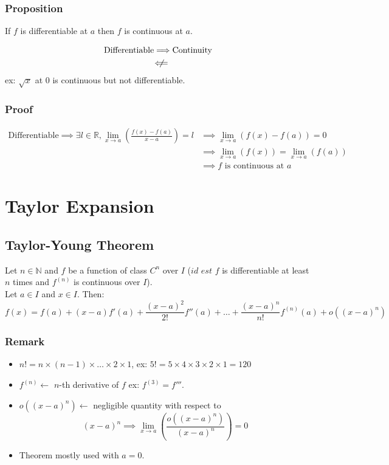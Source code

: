 \documentclass[notitlepage]{math}
\begin{document}
\subsubsection{Proposition}
\begin{minipage}{0.35\linewidth}
    If $f$ is differentiable at $a$ then $f$ is continuous at $a$.
\end{minipage}
\hfill\vline\hfill
\begin{minipage}{0.54\linewidth}
    \begin{align*}
        \text{Differentiable} &\Longrightarrow \text{Continuity}\\
        &\;\not\!\!\!\Longleftarrow  
    \end{align*}
        ex: $\sqrt{x}$ at $0$ is continuous but not differentiable.
\end{minipage}
\subsubsection{Proof}
\begin{align*}
    \text{Differentiable} \implies \exists l \in \mathbb{R}, \lim_{x \to a} \left(\frac{f(x)-f(a)}{x-a}\right) = l &\implies \lim_{x \to a} \left(f(x) - f(a)\right) = 0\\
    &\implies \lim_{x \to a} \left(f(x)\right) = \lim_{x \to a} \left(f(a)\right)\\
    &\implies f \text{ is continuous at } a
\end{align*}
\section{Taylor Expansion}
\subsection{Taylor-Young Theorem}
Let $n \in \mathbb{N}$ and $f$ be a function of class $C^n$ over $I$ ($\textit{id est } f$ is differentiable at least $n$ times and $f^{(n)}$ is continuous over $I$).\\
Let $a \in I$ and $x \in I$. Then:
\[f(x) = f(a) + (x-a)f'(a) + \frac{(x-a)^2}{2!}f''(a) + \dots + \frac{(x-a)^n}{n!}f^{(n)}(a) + o((x-a)^n)\]
\subsubsection{Remark}
\begin{itemize}
    \item $n! = n \times (n-1) \times \dots \times 2 \times 1$, ex: $5! = 5 \times 4 \times 3 \times 2 \times 1 = 120$
    \item $f^{(n)} \leftarrow$ $n$-th derivative of $f$  ex: $f^{(3)} = f'''$.
    \item $o((x-a)^n) \leftarrow$ negligible quantity with respect to \[ {(x-a)}^n \implies \lim_{x \to a} \left(\frac{o((x-a)^n)}{(x-a)^n}\right) = 0\]
    \item Theorem mostly used with $a=0$.
\end{itemize}
\end{document}

